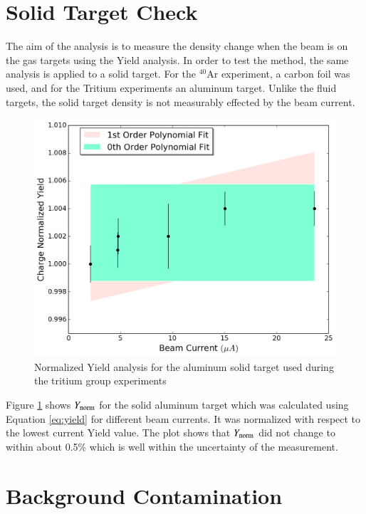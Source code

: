 \documentclass[review,numbers,sort&compress]{elsarticle}
\begin{document}
\section{Solid Target Check}

The aim of the analysis is to measure the density change when the beam is on the gas targets using the Yield analysis. In order to test the method, the same analysis is applied to a solid target. For the $^{40}$Ar experiment, a carbon foil was used, and for the Tritium experiments an aluminum target. Unlike the fluid targets, the solid target density is not measurably effected by the beam current.

\begin{figure}[htbp]
    \centering
    \includegraphics[width=\linewidth]{images/solid_target.pdf}
    \caption{Normalized Yield analysis for the aluminum solid target used during the tritium group experiments}
    \label{fig:solid}
\end{figure}

Figure \ref{fig:solid} shows $Y_{\rm{norm}}$ for the solid aluminum target which was calculated using Equation \ref{eq:yield} for 
different beam currents. It was normalized with respect to the lowest current Yield value. The plot shows that  $Y_{\rm{norm}}$ 
did not change to within about 0.5$\%$ which is well within the uncertainty of the measurement. 

\section{Background Contamination}
\end{document}
